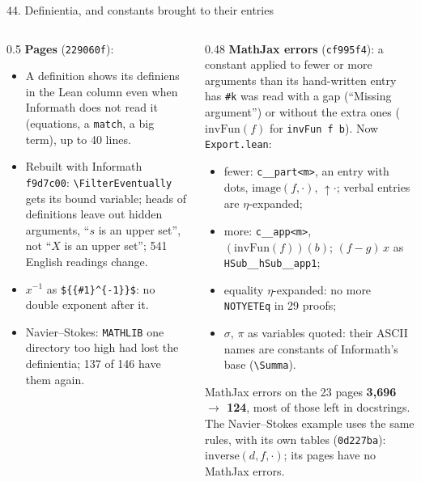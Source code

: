 \documentclass[10pt,aspectratio=169]{beamer}
\newcommand{\bad}[1]{\textcolor{warn}{#1}}
\newcommand{\ok}[1]{\textcolor{good}{#1}}
\newcommand{\commit}[1]{\texttt{\footnotesize #1}}
\begin{document}
\begin{frame}{44. Definientia, and constants brought to their entries}
  \scriptsize
  \begin{columns}[T]
    \begin{column}{0.5\textwidth}
      \textbf{Pages} (\commit{229060f}):
      \begin{itemize}
        \item A definition shows its definiens in the Lean column even when Informath does not
              read it (equations, a \texttt{match}, a big term), up to 40 lines.
        \item Rebuilt with Informath \commit{f9d7c00}: \texttt{\textbackslash FilterEventually}
              gets its bound variable; heads of definitions leave out hidden arguments,
              \ok{``$s$ is an upper set''}, not \bad{``$X$ is an upper set''}; 541 English
              readings change.
        \item $x^{-1}$ as \texttt{\$\{\{\#1\}\^{}\{-1\}\}\$}: no double exponent after it.
        \item Navier--Stokes: \texttt{MATHLIB} one directory too high had lost the definientia;
              137 of 146 have them again.
      \end{itemize}
    \end{column}
    \begin{column}{0.48\textwidth}
      \textbf{MathJax errors} (\commit{cf995f4}): a constant applied to fewer or more arguments
      than its hand-written entry has \texttt{\#k} was read \bad{with a gap} (``Missing
      argument'') or \bad{without the extra ones} ($\mathrm{invFun}(f)$ for
      \texttt{invFun f b}). Now \texttt{Export.lean}:
      \begin{itemize}
        \item fewer: \texttt{c\_\_part<m>}, an entry with dots, \ok{$\mathrm{image}(f, \cdot)$},
              ${\uparrow}\cdot$; verbal entries are $\eta$-expanded;
        \item more: \texttt{c\_\_app<m>}, \ok{$(\mathrm{invFun}(f))(b)$}; $(f - g)\,x$ as
              \texttt{HSub\_\_hSub\_\_app1};
        \item equality $\eta$-expanded: no more \texttt{NOTYETEq} in 29 proofs;
        \item $\sigma$, $\pi$ as variables quoted: their ASCII names are constants of Informath's base (\texttt{\textbackslash Summa}).
      \end{itemize}
      MathJax errors on the 23 pages \textbf{3,696 $\to$ 124}, most of those left in docstrings.
      The Navier--Stokes example uses the same rules, with its own tables (\commit{0d227ba}):
      \ok{$\mathrm{inverse}(d, f, \cdot)$}; its pages have no MathJax errors.
    \end{column}
  \end{columns}
\end{frame}
\end{document}
